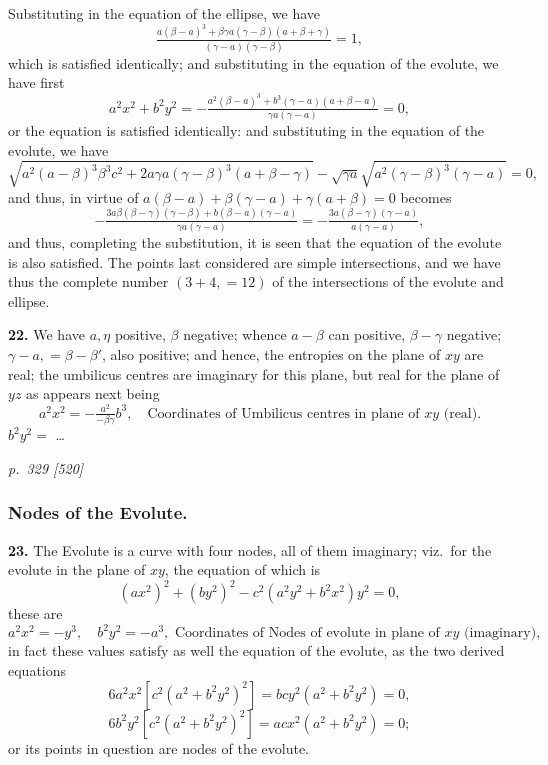 \documentclass[11pt,a4paper]{book}
\begin{document}
Substituting in the equation of the ellipse, we have
\[
\tfrac{a(\beta - a)^3 + \beta\gamma a(\gamma - \beta)(a + \beta + \gamma)}{(\gamma - a)(\gamma - \beta)} = 1,
\]
which is satisfied identically; and substituting in the equation of the evolute, we have first
\[
a^2 x^2 + b^2 y^2 = -\tfrac{a^2(\beta - a)^3 + b^3(\gamma - a)(a + \beta - a)}{\gamma a(\gamma - a)} = 0,
\]
or the equation is satisfied identically: and substituting in the equation of the evolute, we have
\[
\sqrt{a^2(a - \beta)^3 \beta^3 c^2 + 2a\gamma a(\gamma - \beta)^3(a + \beta - \gamma)} - \sqrt{\gamma a}\sqrt{a^2(\gamma - \beta)^3(\gamma - a)} = 0,
\]
and thus, in virtue of $a(\beta - a) + \beta(\gamma - a) + \gamma(a + \beta) = 0$ becomes
\[
-\tfrac{3a\beta(\beta - \gamma)(\gamma - \beta) + b(\beta - a)(\gamma - a)}{\gamma a(\gamma - a)} = -\tfrac{3a(\beta - \gamma)(\gamma - a)}{a(\gamma - a)},
\]
and thus, completing the substitution, it is seen that the equation of the evolute is also satisfied. The points last considered are simple intersections, and we have thus the complete number $(3 + 4, = 12)$ of the intersections of the evolute and ellipse.

\textbf{22.} We have $a, \eta$ positive, $\beta$ negative; whence $a - \beta$ can positive, $\beta - \gamma$ negative; $\gamma - a, = \beta - \beta'$, also positive; and hence, the entropies on the plane of $xy$ are real; the umbilicus centres are imaginary for this plane, but real for the plane of $yz$ as appears next being
\[
a^2 x^2 = -\tfrac{a^2}{-\beta\gamma}b^3,\quad\text{Coordinates of Umbilicus centres in plane of $xy$ (real).}
\]
$b^2 y^2 = $ \ldots

\clearpage

\bigskip
\textit{p.~329 [520]}
\smallskip

\subsubsection*{Nodes of the Evolute.}

\textbf{23.} The Evolute is a curve with four nodes, all of them imaginary; viz.\ for the evolute in the plane of $xy$, the equation of which is
\[
(a x^2)^2 + (b y^2)^2 - c^2(a^2 y^2 + b^2 x^2) y^2 = 0,
\]
these are
\[
a^2 x^2 = -y^3,\quad b^2 y^2 = -a^3,\text{ Coordinates of Nodes of evolute in plane of $xy$ (imaginary)},
\]
in fact these values satisfy as well the equation of the evolute, as the two derived equations
\[
6a^2 x^2 [c^2(a^2 + b^2 y^2)^2] = b c y^2(a^2 + b^2 y^2) = 0,
\]
\[
6b^2 y^2 [c^2(a^2 + b^2 y^2)^2] = a c x^2(a^2 + b^2 y^2) = 0;
\]
or its points in question are nodes of the evolute.
\end{document}
